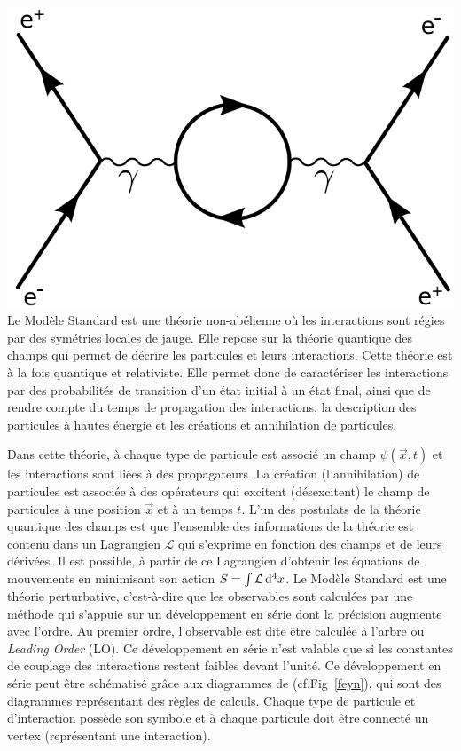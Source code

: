 {	\includegraphics[width=\marginparwidth]{SM/feyn3.png}
	\label{feyn}
}
Le Modèle Standard est une théorie non-abélienne où les interactions sont régies par des symétries locales de jauge. Elle repose sur la théorie quantique des champs qui permet de décrire les particules et leurs interactions. Cette théorie est à la fois quantique et relativiste. Elle permet donc de caractériser les interactions par des probabilités de transition d'un état initial à un état final, ainsi que de rendre compte du temps de propagation des interactions, la description des particules à hautes énergie et les créations et annihilation de particules.

Dans cette théorie, à chaque type de particule est associé un champ $\psi(\vec{x},t)$ et les interactions sont liées à des propagateurs. La création (l'annihilation) de particules est associée à des opérateurs qui excitent (désexcitent) le champ de particules à une position $\vec{x}$ et à un temps $t$. L'un des postulats de la théorie quantique des champs est que l'ensemble des informations de la théorie est contenu dans un Lagrangien $\mathcal{L}$ qui s'exprime en fonction des champs et de leurs dérivées. Il est possible, à partir de ce Lagrangien d'obtenir les équations de mouvements en minimisant son action $S=\int\mathcal{L}\mathop{}\!\mathrm{d^4}{x}$.
Le Modèle Standard est une théorie perturbative, c'est-à-dire que les observables sont calculées par une méthode qui s'appuie sur un développement en série dont la précision augmente avec l'ordre. Au premier ordre, l'observable est dite être calculée à l'arbre ou \textit{Leading Order} (LO). Ce développement en série n'est valable que si les constantes de couplage des interactions restent faibles devant l'unité. Ce développement en série peut être schématisé grâce aux diagrammes de  (cf.Fig~\ref{feyn}), qui sont des diagrammes représentant des règles de calculs. Chaque type de particule et d'interaction possède son symbole et à chaque particule doit être connecté un vertex (représentant une interaction).

